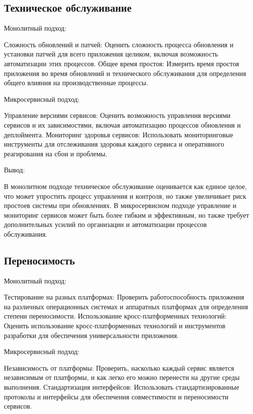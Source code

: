\subsection{Техническое обслуживание}

Монолитный подход:

    Сложность обновлений и патчей: Оценить сложность процесса обновления и установки патчей для всего приложения целиком, включая возможность автоматизации этих процессов.
    Общее время простоя: Измерить время простоя приложения во время обновлений и технического обслуживания для определения общего влияния на производственные процессы.

Микросервисный подход:

    Управление версиями сервисов: Оценить возможность управления версиями сервисов и их зависимостями, включая автоматизацию процессов обновления и деплоймента.
    Мониторинг здоровья сервисов: Использовать мониторинговые инструменты для отслеживания здоровья каждого сервиса и оперативного реагирования на сбои и проблемы.

Вывод:

    В монолитном подходе техническое обслуживание оценивается как единое целое, что может упростить процесс управления и контроля, но также увеличивает риск простоев системы при обновлениях.
    В микросервисном подходе управление и мониторинг сервисов может быть более гибким и эффективным, но также требует дополнительных усилий по организации и автоматизации процессов обслуживания.

\subsection{Переносимость}

Монолитный подход:

    Тестирование на разных платформах: Проверить работоспособность приложения на различных операционных системах и аппаратных платформах для определения степени переносимости.
    Использование кросс-платформенных технологий: Оценить использование кросс-платформенных технологий и инструментов разработки для обеспечения универсальности приложения.

Микросервисный подход:

    Независимость от платформы: Проверить, насколько каждый сервис является независимым от платформы, и как легко его можно перенести на другие среды выполнения.
    Стандартизация интерфейсов: Использовать стандартизированные протоколы и интерфейсы для обеспечения совместимости и переносимости сервисов.

